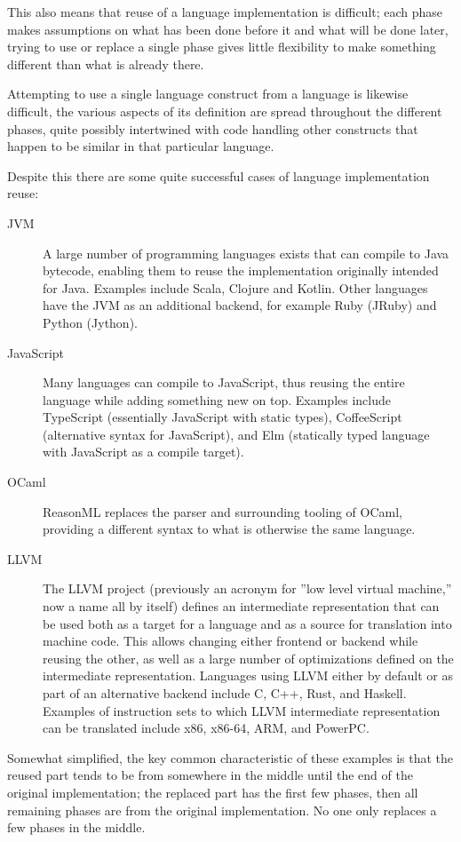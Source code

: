 \documentclass{kththesis}
\begin{document}
This also means that reuse of a language implementation is difficult; each phase makes assumptions on what has been done before it and what will be done later, trying to use or replace a single phase gives little flexibility to make something different than what is already there.

Attempting to use a single language construct from a language is likewise difficult, the various aspects of its definition are spread throughout the different phases, quite possibly intertwined with code handling other constructs that happen to be similar in that particular language.

Despite this there are some quite successful cases of language implementation reuse:

\begin{description}
  \item[JVM] A large number of programming languages exists that can compile to Java bytecode, enabling them to reuse the implementation originally intended for Java. Examples include Scala, Clojure and Kotlin. Other languages have the JVM as an additional backend, for example Ruby (JRuby) and Python (Jython). %
  \item[JavaScript] Many languages can compile to JavaScript, thus reusing the entire language while adding something new on top. Examples include TypeScript (essentially JavaScript with static types), CoffeeScript (alternative syntax for JavaScript), and Elm (statically typed language with JavaScript as a compile target).
  \item[OCaml] ReasonML replaces the parser and surrounding tooling of OCaml, providing a different syntax to what is otherwise the same language.
  \item[LLVM] The LLVM project (previously an acronym for ''low level virtual machine,'' now a name all by itself) defines an intermediate representation that can be used both as a target for a language and as a source for translation into machine code. This allows changing either frontend or backend while reusing the other, as well as a large number of optimizations defined on the intermediate representation. Languages using LLVM either by default or as part of an alternative backend include C, C++, Rust, and Haskell. Examples of instruction sets to which LLVM intermediate representation can be translated include x86, x86-64, ARM, and PowerPC.
\end{description}

Somewhat simplified, the key common characteristic of these examples is that the reused part tends to be from somewhere in the middle until the end of the original implementation; the replaced part has the first few phases, then all remaining phases are from the original implementation. No one only replaces a few phases in the middle.
\end{document}
